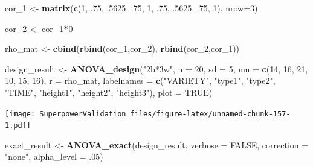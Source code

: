 \documentclass[
]{book}
\newenvironment{Shaded}{\begin{snugshade}}{\end{snugshade}}
\newcommand{\DataTypeTok}[1]{\textcolor[rgb]{0.13,0.29,0.53}{#1}}
\newcommand{\DecValTok}[1]{\textcolor[rgb]{0.00,0.00,0.81}{#1}}
\newcommand{\FloatTok}[1]{\textcolor[rgb]{0.00,0.00,0.81}{#1}}
\newcommand{\KeywordTok}[1]{\textcolor[rgb]{0.13,0.29,0.53}{\textbf{#1}}}
\newcommand{\NormalTok}[1]{#1}
\newcommand{\OperatorTok}[1]{\textcolor[rgb]{0.81,0.36,0.00}{\textbf{#1}}}
\newcommand{\OtherTok}[1]{\textcolor[rgb]{0.56,0.35,0.01}{#1}}
\newcommand{\StringTok}[1]{\textcolor[rgb]{0.31,0.60,0.02}{#1}}
\begin{document}
\begin{Shaded}
\begin{Highlighting}[]
\NormalTok{cor_}\DecValTok{1}\NormalTok{ <-}\StringTok{ }\KeywordTok{matrix}\NormalTok{(}\KeywordTok{c}\NormalTok{(}\DecValTok{1}\NormalTok{, }\FloatTok{.75}\NormalTok{, }\FloatTok{.5625}\NormalTok{,}
                  \FloatTok{.75}\NormalTok{, }\DecValTok{1}\NormalTok{, }\FloatTok{.75}\NormalTok{,}
                  \FloatTok{.5625}\NormalTok{, }\FloatTok{.75}\NormalTok{, }\DecValTok{1}\NormalTok{), }\DataTypeTok{nrow=}\DecValTok{3}\NormalTok{)}

\NormalTok{cor_}\DecValTok{2}\NormalTok{ <-}\StringTok{ }\NormalTok{cor_}\DecValTok{1}\OperatorTok{*}\DecValTok{0}

\NormalTok{rho_mat <-}\StringTok{ }\KeywordTok{cbind}\NormalTok{(}\KeywordTok{rbind}\NormalTok{(cor_}\DecValTok{1}\NormalTok{,cor_}\DecValTok{2}\NormalTok{),}
                      \KeywordTok{rbind}\NormalTok{(cor_}\DecValTok{2}\NormalTok{,cor_}\DecValTok{1}\NormalTok{))}

\NormalTok{design_result <-}\StringTok{ }\KeywordTok{ANOVA_design}\NormalTok{(}\StringTok{"2b*3w"}\NormalTok{,}
                              \DataTypeTok{n =} \DecValTok{20}\NormalTok{,}
                              \DataTypeTok{sd =} \DecValTok{5}\NormalTok{,}
                              \DataTypeTok{mu =} \KeywordTok{c}\NormalTok{(}\DecValTok{14}\NormalTok{, }\DecValTok{16}\NormalTok{, }\DecValTok{21}\NormalTok{,}
                                     \DecValTok{10}\NormalTok{, }\DecValTok{15}\NormalTok{, }\DecValTok{16}\NormalTok{),}
                              \DataTypeTok{r =}\NormalTok{ rho_mat,}
                              \DataTypeTok{labelnames =} \KeywordTok{c}\NormalTok{(}\StringTok{"VARIETY"}\NormalTok{, }
                                             \StringTok{"type1"}\NormalTok{, }\StringTok{"type2"}\NormalTok{,}
                                             \StringTok{"TIME"}\NormalTok{, }
                                             \StringTok{"height1"}\NormalTok{, }\StringTok{"height2"}\NormalTok{, }
                                             \StringTok{"height3"}\NormalTok{),}
                              \DataTypeTok{plot =} \OtherTok{TRUE}\NormalTok{)}
\end{Highlighting}
\end{Shaded}

\texttt{[image: SuperpowerValidation\_files/figure-latex/unnamed-chunk-157-1.pdf]}

\begin{Shaded}
\begin{Highlighting}[]
\NormalTok{exact_result <-}\StringTok{ }\KeywordTok{ANOVA_exact}\NormalTok{(design_result, }\DataTypeTok{verbose =} \OtherTok{FALSE}\NormalTok{,}
                            \DataTypeTok{correction =} \StringTok{"none"}\NormalTok{,}
                            \DataTypeTok{alpha_level =} \FloatTok{.05}\NormalTok{)}
\end{Highlighting}
\end{Shaded}
\end{document}
